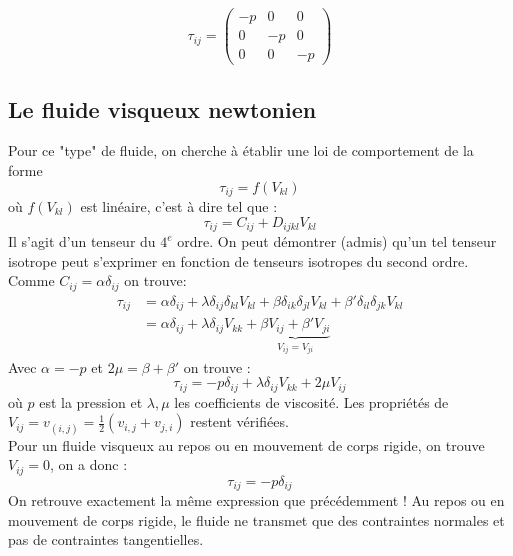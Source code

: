 \begin{equation}
	\tau_{ij} =
	\begin{pmatrix}
		-p & 0  & 0  \\
		0  & -p & 0  \\
		0  & 0  & -p 
	\end{pmatrix}
\end{equation}

    
\subsection{Le fluide visqueux newtonien}
Pour ce "type" de fluide, on cherche à établir une loi de comportement de la forme 
\begin{equation}
	\tau_{ij} = f(V_{kl})
\end{equation}
où $f(V_{kl})$ est linéaire, c'est à dire tel que :
\begin{equation}
	\tau_{ij} = C_{ij} + D_{ijkl}V_{kl}
\end{equation}
Il s'agit d'un tenseur du $4^e$ ordre. On peut démontrer (admis) qu'un tel tenseur isotrope
peut s'exprimer en fonction de tenseurs isotropes du second ordre. Comme $C_{ij} = \alpha
\delta_{ij}$ on trouve:
\begin{equation}
	\begin{array}{ll}
		\tau_{ij} & = \alpha\delta_{ij} + \lambda \delta_{ij}\delta_{kl}V_{kl} + \beta                 
		\delta_{ik}\delta_{jl}V_{kl} + \beta' \delta_{il}\delta_{jk}V_{kl}  \\
		          & = \alpha\delta_{ij} + \lambda\delta_{ij}V_{kk} + \underbrace{\beta V_{ij} + \beta' 
		V_{ji}}_{V_{ij} = V_{ji}}
	\end{array}
\end{equation}
Avec $\alpha = -p$ et $2\mu = \beta + \beta'$ on trouve :
\begin{equation}
	\tau_{ij} = -p\delta_{ij} + \lambda\delta_{ij}V_{kk} + 2\mu V_{ij}
	\label{eq:ComportementVisqNew}
\end{equation}
où $p$ est la pression et $\lambda,\mu$ les coefficients de viscosité. Les propriétés
de $V_{ij} = v_{(i,j)} = \frac{1}{2}(v_{i,j}+v_{j,i})$ restent vérifiées.\\
Pour un fluide visqueux au repos ou en mouvement de corps rigide, on trouve $V_{ij}=0$, 
on a donc :
\begin{equation}
	\tau_{ij} = -p\delta_{ij}
\end{equation}
On retrouve exactement la même expression que précédemment ! Au repos ou en mouvement 
de corps rigide, le fluide ne transmet que des contraintes normales et pas de contraintes
tangentielles.
    
